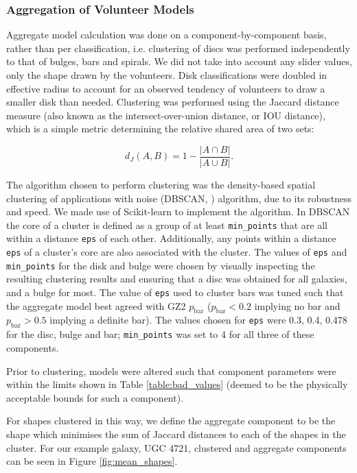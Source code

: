 \documentclass[../main.tex]{subfiles}
\begin{document}
\subsubsection{Aggregation of Volunteer Models}
\label{sec:aggregation_of_volunteer_models}

Aggregate model calculation was done on a component-by-component basis, rather than per classification, i.e. clustering of discs was performed independently to that of bulges, bars and spirals. We did not take into account any slider values, only the shape drawn by the volunteers. Disk classifications were doubled in effective radius to account for an observed tendency of volunteers to draw a smaller disk than needed. Clustering was performed using the Jaccard distance measure (also known as the intersect-over-union distance, or IOU distance), which is a simple metric determining the relative shared area of two sets:

\begin{equation}
d_J(A, B) = 1 - \frac{|A \cap B|}{|A \cup B|}.
\end{equation}

The algorithm chosen to perform clustering was the density-based spatial clustering of applications with noise (DBSCAN, \citealt{dbscan}) algorithm, due to its robustness and speed. We made use of Scikit-learn \citep{scikit-learn} to implement the algorithm. In DBSCAN the core of a cluster is defined as a group of at least \texttt{min\_points} that are all within a distance \texttt{eps} of each other. Additionally, any points within a distance \texttt{eps} of a cluster's core are also associated with the cluster.
The values of \texttt{eps} and \texttt{min\_points} for the disk and bulge were chosen by visually inspecting the resulting clustering results and ensuring that a disc was obtained for all galaxies, and a bulge for most. The value of \texttt{eps} used to cluster bars was tuned such that the aggregate model best agreed with GZ2 $p_\mathrm{bar}$ ($p_\mathrm{bar} < 0.2$ implying no bar and $p_\mathrm{bar} > 0.5$ implying a definite bar). The values chosen for \texttt{eps} were 0.3, 0.4, 0.478 for the disc, bulge and bar; \texttt{min\_points} was set to 4 for all three of these components.

Prior to clustering, models were altered such that component parameters were within the limits shown in Table \ref{table:bad_values} (deemed to be the physically acceptable bounds for such a component).

For shapes clustered in this way, we define the aggregate component to be the shape which minimises the sum of Jaccard distances to each of the shapes in the cluster. For our example galaxy, UGC 4721, clustered and aggregate components can be seen in Figure \ref{fig:mean_shapes}.
\end{document}
